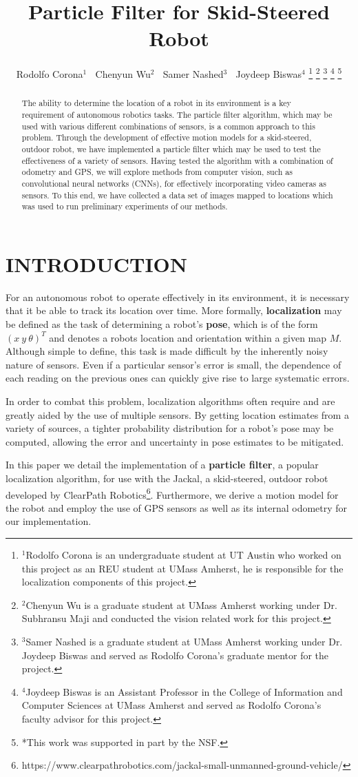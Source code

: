 \documentclass[letterpaper, 12 pt, conference]{ieeeconf}  %
\title{\LARGE \bf
Particle Filter for Skid-Steered Robot
}
\author{Rodolfo Corona$^{1}$ 
$~$ Chenyun Wu$^{2}$ $~$ Samer Nashed$^{3}$ $~$ Joydeep Biswas$^{4}$ %
\thanks{$^{1}$Rodolfo Corona is an undergraduate student at UT Austin who worked on this project as an REU student at UMass Amherst, he is responsible for the localization components of this project.}
\thanks{$^{2}$Chenyun Wu is a graduate student at UMass Amherst working under Dr. Subhransu Maji and conducted the vision related work for this project.}
\thanks{$^{3}$Samer Nashed is a graduate student at UMass Amherst working under Dr. Joydeep Biswas and served as Rodolfo Corona's graduate mentor for the project.}
\thanks{$^{4}$Joydeep Biswas is an Assistant Professor in the College of Information and Computer Sciences at UMass Amherst and served as Rodolfo Corona's faculty advisor for this project.} 
\thanks{*This work was supported in part by the NSF.}
}
\begin{document}
\maketitle
\thispagestyle{empty}
\pagestyle{empty}


\begin{abstract}

The ability to determine the location of a robot in its environment is a key requirement of autonomous robotics tasks. The particle filter algorithm, which may be used with various different combinations of sensors, is a common approach to this problem. Through the development of effective motion models for a skid-steered, outdoor robot, we have implemented a particle filter which may be used to test the effectiveness of a variety of sensors. Having tested the algorithm with a combination of odometry and GPS, we will explore methods from computer vision, such as convolutional neural networks (CNNs), for effectively incorporating video cameras as sensors. To this end, we have collected a data set of images mapped to locations which was used to run preliminary experiments of our methods. 

\end{abstract}


\section{INTRODUCTION}
For an autonomous robot to operate effectively in its environment, it is necessary that it be able to track its location over time. More formally, \textbf{localization} may be defined as the task of determining a robot's \textbf{pose}, which is of the form $(x~y~\theta)^T$ and denotes a robots location and orientation within a given map $M$. Although simple to define, this task is made difficult by the inherently noisy nature of sensors. Even if a particular sensor's error is small, the dependence of each reading on the previous ones can quickly give rise to large systematic errors.  
\par
In order to combat this problem, localization algorithms often require and are greatly aided by the use of multiple sensors. By getting location estimates from a variety of sources, a tighter probability distribution for a robot's pose may be computed, allowing the error and uncertainty in pose estimates to be mitigated. 
\par
In this paper we detail the implementation of a \textbf{particle filter}, a popular localization algorithm, for use with the Jackal, a skid-steered, outdoor robot developed by ClearPath Robotics\footnote{https://www.clearpathrobotics.com/jackal-small-unmanned-ground-vehicle/}. Furthermore, we derive a motion model for the robot and employ the use of GPS sensors as well as its internal odometry for our implementation.
\end{document}
